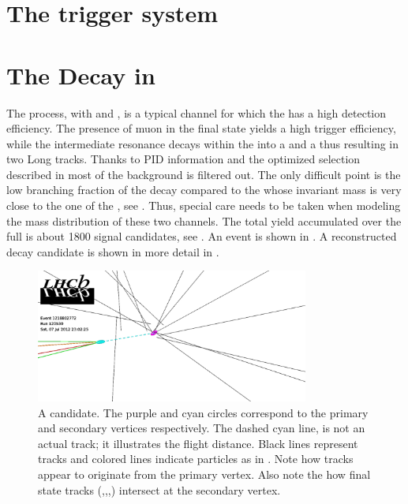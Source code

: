 \section{The trigger system}
\label{det_trigger}


\section{The \BsJpsiKst Decay in \lhcb}
\label{BspsiKst_at_lhcb}

The \BsJpsiKst process, with \Jpsimumu and \KstKpi, is a typical channel for which the \lhcb has a high detection efficiency.
The presence of muon in the final state yields a high trigger efficiency, while the intermediate
\Kstarz resonance decays within the \velo into a \Kp and a \pim thus resulting in two Long tracks.
Thanks to PID information and the optimized selection described in  most of the background
is filtered out. The only difficult point is the low branching fraction of the \BsJpsiKst decay
compared to the \BdJpsiKst whose invariant mass is very close to the one of the \BsJpsiKst, see .
Thus, special care needs to be taken when modeling the mass distribution of these two channels.
The total \BsJpsiKst yield accumulated over the full \runone is about 1800 signal candidates, see .
An \lhcb event is shown in . A reconstructed \BsJpsiKst decay candidate is shown in
more detail in .

\begin{figure}[t]
  \centering
 \includegraphics[width=0.8\textwidth,trim=0cm 0cm 17cm 0cm, clip=true]{Figures/Chapter2/jpsikst_event.pdf}
  \caption{A \BsJpsiKst candidate. The purple and cyan circles correspond to the primary and secondary
           vertices respectively. The dashed cyan line, is not an actual track; it illustrates the \Bs flight distance.
            Black lines represent \velo tracks and colored lines indicate particles as in .
            Note how \velo tracks appear to originate from the primary vertex. Also note the how \Bs final state tracks
            ({\color{green}\mmu},{\color{green}\mmu},{\color{red}\kaon},{\color{orange}\pion}) intersect at the secondary vertex.}
  \label{det_jpsikst_cand}
\end{figure}

